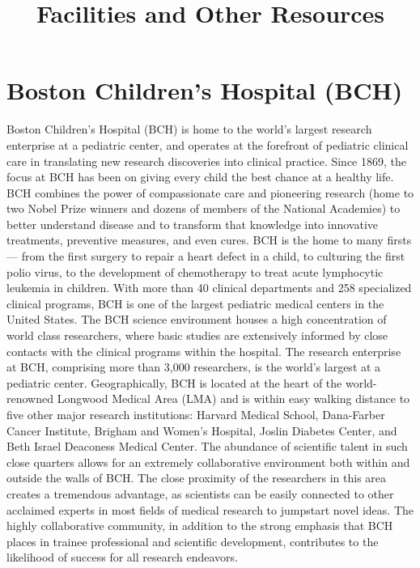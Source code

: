 \documentclass[11pt]{amsart}
\title{Facilities and Other Resources}
\author{}
\date{}
\begin{document}
\maketitle
\hypertarget{x-boston-children’s-hospital-(bch)}{\section*{Boston Children’s Hospital (BCH)}}
Boston Children’s Hospital (BCH) is home to the world’s largest research enterprise at a pediatric center, and operates at the forefront of pediatric clinical care in translating new research discoveries into clinical practice. Since 1869, the focus at BCH has been on giving every child the best chance at a healthy life. BCH combines the power of compassionate care and pioneering research (home to two Nobel Prize winners and dozens of members of the National Academies) to better understand disease and to transform that knowledge into innovative treatments, preventive measures, and even cures. BCH is the home to many firsts — from the first surgery to repair a heart defect in a child, to culturing the first polio virus, to the development of chemotherapy to treat acute lymphocytic leukemia in children. With more than 40 clinical departments and 258 specialized clinical programs, BCH is one of the largest pediatric medical centers in the United States. The BCH science environment houses a high concentration of world class researchers, where basic studies are extensively informed by close contacts with the clinical programs within the hospital. The research enterprise at BCH, comprising more than 3,000 researchers, is the world’s largest at a pediatric center. Geographically, BCH is located at the heart of the world-renowned Longwood Medical Area (LMA) and is within easy walking distance to five other major research institutions: Harvard Medical School, Dana-Farber Cancer Institute, Brigham and Women’s Hospital, Joslin Diabetes Center, and Beth Israel Deaconess Medical Center. The abundance of scientific talent in such close quarters allows for an extremely collaborative environment both within and outside the walls of BCH. The close proximity of the researchers in this area creates a tremendous advantage, as scientists can be easily connected to other acclaimed experts in most fields of medical research to jumpstart novel ideas. The highly collaborative community, in addition to the strong emphasis that BCH places in trainee professional and scientific development, contributes to the likelihood of success for all research endeavors.
\end{document}
